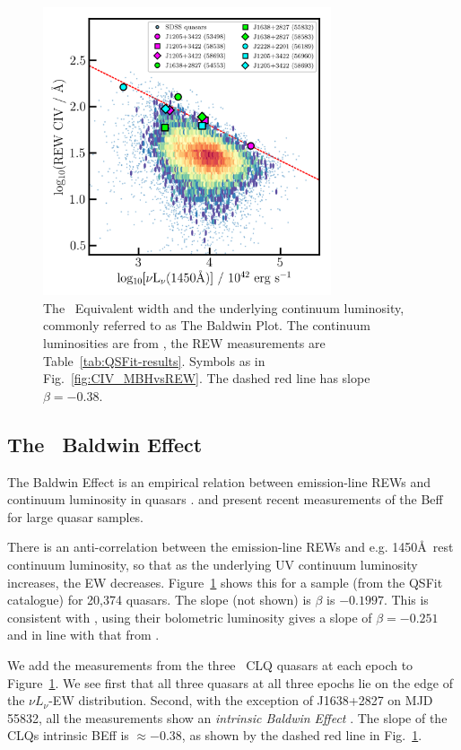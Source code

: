 \documentclass[fleqn,usenatbib]{mnras}
\begin{document}
\begin{figure}
  \centering
  \includegraphics[width=8.5cm, trim=0.2cm 0.2cm 0.0cm 0.2cm, clip]
  {figures/CIV_CLQs_Baldwin_20191130.png}
   \vspace{-12pt}
   \caption[]{The \civ\ Equivalent width and the underlying continuum luminosity,
     commonly referred to as The Baldwin Plot.
     The continuum luminosities are  from \citet{Calderone2017},
     the REW measurements are Table~\ref{tab:QSFit-results}.
     Symbols as in Fig.~\ref{fig:CIV_MBHvsREW}.
     The dashed red line has slope $\beta=-0.38$.}
  \label{fig:CIV_Baldwin}
\end{figure}
\subsection{The \civ\ Baldwin Effect}
The Baldwin Effect \citep[Beff; ][]{Baldwin1977} is an empirical 
relation between emission-line REWs and continuum luminosity in
quasars \citep[][]{Shields2007, Hamann2017, Calderone2017}.
\citet{Hamann2017} and \citet{Calderone2017} present recent
measurements of the Beff for large quasar samples. 

There is an anti-correlation between the emission-line REWs and
e.g. 1450\AA\ rest continuum luminosity, so that as the underlying UV
continuum luminosity increases, the EW decreases. 
Figure~\ref{fig:CIV_Baldwin} shows this for a sample (from the QSFit catalogue)
for 20,374 quasars.  The slope (not shown) is $\beta$ is $-0.1997$.
This is consistent with \citet{Kozlowski2017}, using their bolometric
luminosity gives a slope of $\beta=-0.251$ and in line with that from
\citet[][ $\beta=-0.23$]{Hamann2017}.

We add the measurements from the three \civ\ CLQ quasars at each epoch
to Figure~\ref{fig:CIV_Baldwin}. We see first that all three quasars
at all three epochs lie on the edge of the $\nu L_{\nu}$-EW
distribution.  Second, with the exception of J1638+2827 on MJD 55832,
all the measurements show an {\it intrinsic Baldwin Effect}
\citep[e.g.][]{Goad2004, Rakic2017}.  The slope of the CLQs intrinsic
BEff is $\approx-0.38$, as shown by the dashed red line in
Fig.~\ref{fig:CIV_Baldwin}.
\end{document}
